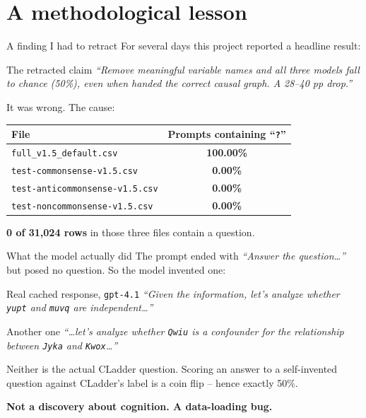 \documentclass{beamer}
\begin{document}
\section{A methodological lesson}
\begin{frame}
  \sectionpage
\end{frame}

\begin{frame}{A finding I had to retract}
  For several days this project reported a headline result:

  \begin{block}{The retracted claim}
    \emph{``Remove meaningful variable names and all three models fall to
    chance (50\%), even when handed the correct causal graph. A 28--40 pp
    drop.''}
  \end{block}

  \vspace{0.3cm}
  It was wrong. The cause:

  \begin{center}
  \begin{tabular}{lc}
    \toprule
    File & Prompts containing ``\texttt{?}'' \\
    \midrule
    \texttt{full\_v1.5\_default.csv}      & \textbf{100.00\%} \\
    \texttt{test-commonsense-v1.5.csv}    & \textbf{0.00\%} \\
    \texttt{test-anticommonsense-v1.5.csv}& \textbf{0.00\%} \\
    \texttt{test-noncommonsense-v1.5.csv} & \textbf{0.00\%} \\
    \bottomrule
  \end{tabular}
  \end{center}

  \vspace{0.2cm}
  \textbf{0 of 31{,}024 rows} in those three files contain a question.
\end{frame}

\begin{frame}{What the model actually did}
  The prompt ended with \emph{``Answer the question\dots''} but posed no
  question. So the model invented one:

  \begin{block}{Real cached response, \texttt{gpt-4.1}}
    \emph{``Given the information, let's analyze whether \texttt{yupt} and
    \texttt{muvq} are independent\dots''}
  \end{block}
  \begin{block}{Another one}
    \emph{``\dots let's analyze whether \texttt{Qwiu} is a confounder for the
    relationship between \texttt{Jyka} and \texttt{Kwox}\dots''}
  \end{block}

  \vspace{0.2cm}
  Neither is the actual CLadder question. Scoring an answer to a
  self-invented question against CLadder's label is a coin flip -- hence
  exactly 50\%.

  \vspace{0.2cm}
  \textbf{Not a discovery about cognition. A data-loading bug.}
\end{frame}
\end{document}

